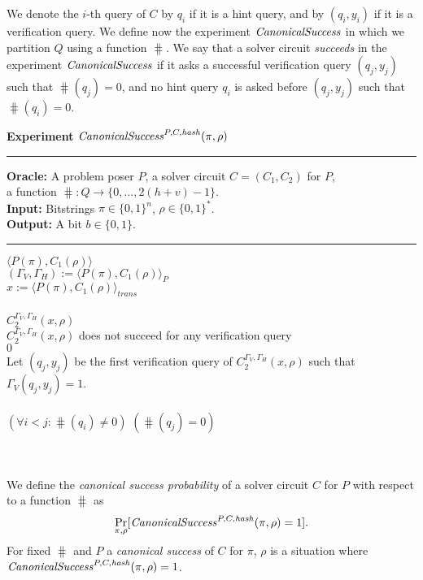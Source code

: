 We denote the $i$-th query of $C$ by $q_i$ if it is a hint query, and by $(q_i, y_i)$ if it is a verification query.
We define now the experiment $\operatorname{\mathit{CanonicalSuccess}}$ in which we partition $Q$ using a function $\hash$.
We say that a solver circuit \textit{succeeds} in the experiment $\operatorname{\mathit{CanonicalSuccess}}$
if it asks a successful verification query $(q_j, y_j)$ such that $\hash(q_j) = 0$,
and no hint query $q_i$ is asked before $(q_j, y_j)$ such that $\hash(q_i) = 0$.
%
\begin{codeblock}
  \textbf{Experiment} $\operatorname{\mathit{CanonicalSuccess}}^{P, C, \operatorname{\mathit{hash}}}(\pi, \rho)$
  \medskip \hrule \medskip
  \textbf{Oracle:} A problem poser $P$, a solver circuit $C = (C_1, C_2)$ for $P$,\\
  \IndII a function $\hash: Q \rightarrow \{0, \dots, 2(h+v) - 1\}$.\\
  \textbf{Input:}  Bitstrings $\pi \in \{0,1\}^n$, $\rho \in \{0,1\}^*$. \\
  \textbf{Output:} A bit $b \in \{0,1\}$.

  \medskip\hrule\medskip
  \Run $\langle P(\pi), C_1(\rho) \rangle$ \\
  \IndI $(\Gamma_V, \Gamma_H) := \langle P(\pi), C_1(\rho) \rangle_{P}$ \\
  \IndI $x := \langle P(\pi), C_1(\rho) \rangle_{\mathit{trans}}$ \\ \\
  \Run $C_2^{\Gamma_V, \Gamma_H} (x, \rho)$ \\
  \IndI \If $C_2^{\Gamma_V, \Gamma_H} (x, \rho)$ does not succeed for any verification query \Then \\
  \IndII \Return $0$ \\
  \IndI Let $(q_j,y_j)$ be the first verification query of $C_2^{\Gamma_V, \Gamma_H} (x, \rho)$ such that $\Gamma_V(q_j, y_j) = 1$.\\
  \\
  \If $(\forall i < j :  \hash(q_i) \neq 0)$ \And $(\hash(q_j) = 0)$ \Then \\
  \IndI {}\\
  \Else\\
  \IndI {}
\end{codeblock}
%
We define the \textit{canonical success probability} of a solver circuit $C$ for $P$ with respect to a function $\hash$ as
\begin{align}
 \underset{\pi, \rho}{\Pr}[\operatorname{\mathit{CanonicalSuccess}}^{P, C, \operatorname{\mathit{hash}}}(\pi, \rho) = 1].
\end{align}
%
For fixed $\hash$ and $P$ a \textit{canonical success} of $C$ for $\pi$, $\rho$ is a situation where
$\operatorname{\mathit{CanonicalSuccess}}^{P, C, \operatorname{\mathit{hash}}}(\pi, \rho) = 1$.

